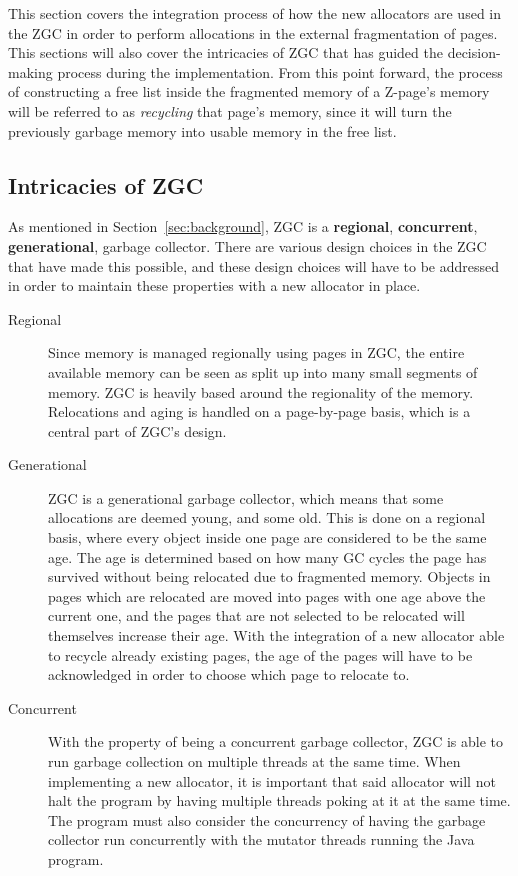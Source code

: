 
This section covers the integration process of how the new allocators are used in the ZGC in order to perform allocations in the external fragmentation of pages. This sections will also cover the intricacies of ZGC that has guided the decision-making process during the implementation. From this point forward, the process of constructing a free list inside the fragmented memory of a Z-page's memory will be referred to as \textit{recycling} that page's memory, since it will turn the previously garbage memory into usable memory in the free list.

\subsection{Intricacies of ZGC}
As mentioned in Section~\ref*{sec:background}, ZGC is a \textbf{regional}, \textbf{concurrent}, \textbf{generational}, garbage collector. There are various design choices in the ZGC that have made this possible, and these design choices will have to be addressed in order to maintain these properties with a new allocator in place. 
\begin{description}
    \item[Regional] Since memory is managed regionally using pages in ZGC, the entire available memory can be seen as split up into many small segments of memory. ZGC is heavily based around the regionality of the memory. Relocations and aging is handled on a page-by-page basis, which is a central part of ZGC's design.
    \item[Generational] ZGC is a generational garbage collector, which means that some allocations are deemed young, and some old. This is done on a regional basis, where every object inside one page are considered to be the same age. The age is determined based on how many GC cycles the page has survived without being relocated due to fragmented memory. Objects in pages which are relocated are moved into pages with one age above the current one, and the pages that are not selected to be relocated will themselves increase their age. With the integration of a new allocator able to recycle already existing pages, the age of the pages will have to be acknowledged in order to choose which page to relocate to.
    \item[Concurrent] With the property of being a concurrent garbage collector, ZGC is able to run garbage collection on multiple threads at the same time. When implementing a new allocator, it is important that said allocator will not halt the program by having multiple threads poking at it at the same time. The program must also consider the concurrency of having the garbage collector run concurrently with the mutator threads running the Java program.
\end{description}

